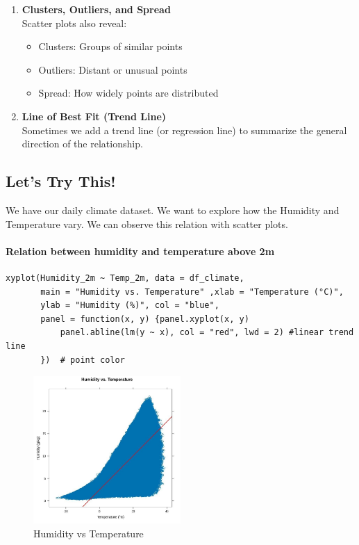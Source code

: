 \begin{enumerate}
    \item \textbf{Clusters, Outliers, and Spread} \\
    Scatter plots also reveal:
    \begin{itemize}
        \item Clusters: Groups of similar points 
        \item Outliers: Distant or unusual points
        \item Spread: How widely points are distributed
    \end{itemize}

    \item \textbf{Line of Best Fit (Trend Line)} \\
    Sometimes we add a trend line (or regression line) to summarize the general direction of the relationship.
\end{enumerate}

\subsection*{Let’s Try This!}

We have our daily climate dataset. We want to explore how the Humidity and Temperature vary. We can observe this relation with scatter plots.

\paragraph{Relation between humidity and temperature above 2m}

\begin{verbatim}
xyplot(Humidity_2m ~ Temp_2m, data = df_climate,
       main = "Humidity vs. Temperature" ,xlab = "Temperature (°C)",
       ylab = "Humidity (%)", col = "blue",
       panel = function(x, y) {panel.xyplot(x, y)
           panel.abline(lm(y ~ x), col = "red", lwd = 2) #linear trend line
       })  # point color
\end{verbatim}

\begin{figure}[h]
\centering
\includegraphics[width=0.5\textwidth]{figures/scatter1.jpg}
\caption{Humidity vs Temperature}
\end{figure}

